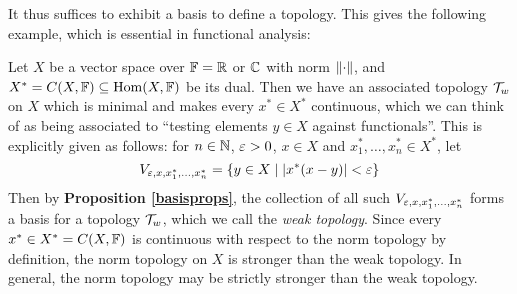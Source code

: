 \documentclass[11pt]{article}
\begin{document}
It thus suffices to exhibit a basis to define a topology. This gives the following example, which is essential in functional analysis:
\begin{example}
    Let $X$ be a vector space over $\mathbb{F} = \mathbb{R}$ or $\mathbb{C}$ with norm $\left\| \cdot \right\|$, and $X^* = C(X, \mathbb{F}) \subseteq \operatorname{Hom}(X, \mathbb{F})$ be its dual. Then we have an associated topology $\mathcal{T}_w$ on $X$ which is minimal and makes every $x^* \in X^*$ continuous, which we can think of as being associated to ``testing elements $y \in X$ against functionals''. This is explicitly given as follows: for $n \in \mathbb{N}$, $\varepsilon > 0$, $x \in X$ and $x_1^*, \ldots, x_n^* \in X^*$, let
    $$
        V_{\varepsilon, x, x_1^*, \ldots, x_n^*} = \left\{  y \in X \mid \left| x^*(x - y) \right| < \varepsilon  \right\}
    $$
    Then by \textbf{Proposition \ref{basisprops}}, the collection of all such $V_{\varepsilon, x, x_1^*, \ldots, x_n^*}$ forms a basis for a topology $\mathcal{T}_w$, which we call the \emph{weak topology}. Since every $x^* \in X^* = C(X, \mathbb{F})$ is continuous with respect to the norm topology by definition, the norm topology on $X$ is stronger than the weak topology. In general, the norm topology may be strictly stronger than the weak topology.
\end{example}
\end{document}
